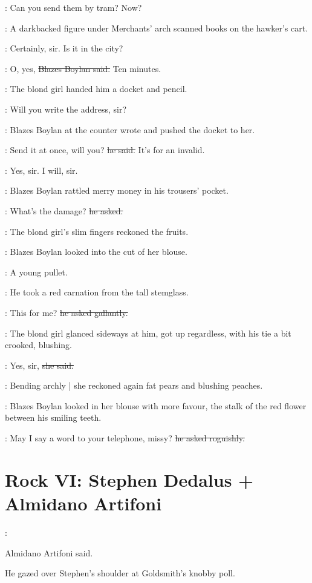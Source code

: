 \boylan:
Can you send them by tram? Now?

:
A darkbacked figure under Merchants' arch
scanned books on the hawker's cart.

\blondgirl:
Certainly, sir.
Is it in the city?

\boylan:
O, yes,
\sout{Blazes Boylan said.}
Ten minutes.

:
The blond girl handed him a docket and pencil.

\blondgirl:
Will you write the address,
sir?

:
Blazes Boylan at the counter wrote
and pushed the docket to her.

\boylan:
Send it at once, will you?
\sout{he said.}
It's for an invalid.

\blondgirl:
Yes, sir. I will, sir.

:
Blazes Boylan rattled merry money in his trousers' pocket.

\boylan:
What's the damage?
\sout{he asked.}

:
The blond girl's slim fingers reckoned the fruits.

:
Blazes Boylan looked into the cut of her blouse.

\boylanint:
A young pullet.

:
He took a red carnation from the tall stemglass.

\boylan:
This for me?
\sout{he asked gallantly.}

:
The blond girl glanced sideways at him,
got up regardless,
with his tie a bit crooked,
blushing.

\blondgirl:
Yes, sir,
\sout{she said.}

:
Bending archly |
she reckoned again fat pears and blushing peaches.

:
Blazes Boylan looked in her blouse with more favour,
the stalk of the red flower between his smiling teeth.

\boylan:
May I say a word to your telephone, missy?
\sout{he asked roguishly.}


\section*{Rock VI: Stephen Dedalus + Almidano Artifoni}


\artifoni:

Almidano Artifoni said.

He gazed over Stephen's shoulder at Goldsmith's knobby poll.

